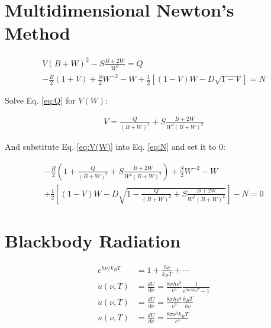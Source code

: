 \documentclass[12pt]{article}
\begin{document}
  

  \clearpage

  \section{Multidimensional Newton's Method}

  \begin{align}
    \label{eq:Q}
    V(B+W)^2 - S\frac{B+2W}{W^2}=Q \\
    \label{eq:N}
    -\frac{B}{2}(1+V)+\frac{S}{2}W^{-2}-W+\frac{1}{2}\left[(1-V)W-D\sqrt{1-V}\right]=N
  \end{align}

  Solve  Eq. \ref{eq:Q} for $V(W)$:

  \begin{align}
    \label{eq:V(W)}
    V = \frac{Q}{(B+W)^2} + S\frac{B+2W}{W^2(B+W)^2}
  \end{align}

  And substitute Eq. \ref{eq:V(W)} into Eq. \ref{eq:N} and set it to 0:
  
  \begin{align}
    -\frac{B}{2}(1+\frac{Q}{(B+W)^2} + S\frac{B+2W}{W^2(B+W)^2})+\frac{S}{2}W^{-2}-W\nonumber\\
+\frac{1}{2}\left[(1-V)W - D\sqrt{1-\frac{Q}{(B+W)^2} + S\frac{B+2W}{W^2(B+W)^2}}\right]-N=0
  \end{align}

  \clearpage

  \section{Blackbody Radiation}
  
  \begin{align} 
    e^{h\nu / k_B T} &= 1 + \frac{h \nu}{k_B T} + \cdots \nonumber \\
    u(\nu, T) &= \frac{dU}{d\nu} =
    \frac{8\pi h \nu^3}{c^3}\frac{1}{e^{h\nu/k_B T}-1} \nonumber \\
    u(\nu, T) &= \frac{dU}{d\nu}  =
      \frac{8\pi h \nu^3}{c^3}\frac{k_B T}{h \nu} \nonumber \\
    \label{eq:nu}
    u(\nu, T) &= \frac{dU}{d\nu}  =
      \frac{8\pi \nu^2 k_B T}{c^3 }
  \end{align}
\end{document}
